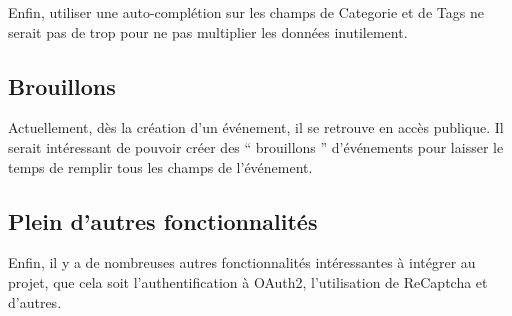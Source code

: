 Enfin, utiliser une auto-complétion sur les champs de Categorie et de Tags ne serait pas de trop pour ne pas multiplier les données inutilement.

\subsection{Brouillons}

Actuellement, dès la création d'un événement, il se retrouve en accès publique. Il serait intéressant de pouvoir créer des `` brouillons '' d'événements pour laisser le temps de remplir tous les champs de l'événement.

\subsection{Plein d'autres fonctionnalités}

Enfin, il y a de nombreuses autres fonctionnalités intéressantes à intégrer au projet, que cela soit l'authentification à OAuth2, l'utilisation de ReCaptcha et d'autres.